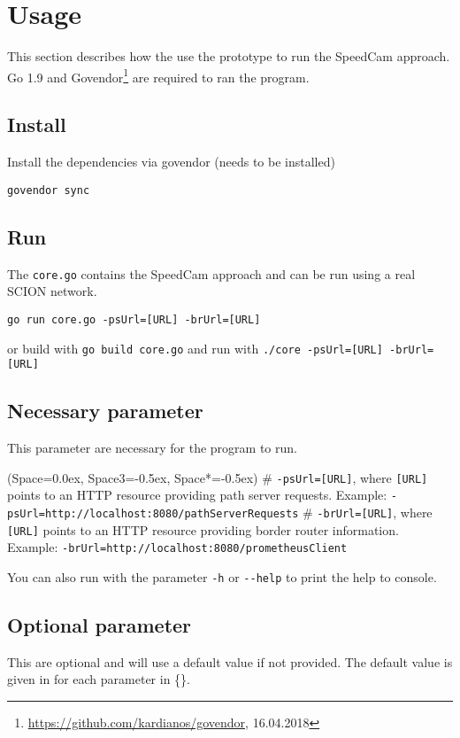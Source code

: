 \documentclass[thesis.tex]{subfiles}
\begin{document}
\section{Usage} \label{app:usage}
This section describes how the use the prototype to run the SpeedCam approach. Go 1.9 and Govendor\footnote{\url{https://github.com/kardianos/govendor}, 16.04.2018} are required to ran the program.

\subsection*{Install}
Install the dependencies via govendor (needs to be installed)

{\lstinline|govendor sync|}

\subsection*{Run}
The {\lstinline|core.go|} contains the SpeedCam approach and can be run using a real SCION network.

{\lstinline|go run core.go -psUrl=[URL] -brUrl=[URL]|}

or build with {\lstinline|go build core.go|} and run with {\lstinline|./core -psUrl=[URL] -brUrl=[URL]|}
\subsection*{Necessary parameter}
This parameter are necessary for the program to run.

\begin{easylist}[itemize]
	\ListProperties(Space=0.0ex, Space3=-0.5ex, Space*=-0.5ex)
	# {\lstinline|-psUrl=[URL]|}, where {\lstinline|[URL]|} points to an HTTP resource providing path server requests. Example: {\lstinline|-psUrl=http://localhost:8080/pathServerRequests|}	
	# {\lstinline|-brUrl=[URL]|}, where {\lstinline|[URL]|} points to an HTTP resource providing border router information. Example: {\lstinline|-brUrl=http://localhost:8080/prometheusClient|}
\end{easylist}

You can also run with the parameter {\lstinline|-h|} or {\lstinline|--help|} to print the help to console.
\subsection*{Optional parameter}
This are optional and will use a default value if not provided. The default value is given in for each parameter in \{\}.
\end{document}
